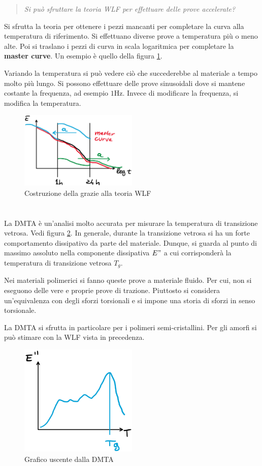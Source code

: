 \begin{quote}
\emph{Si può sfruttare la teoria \ac{WLF} per effettuare delle prove accelerate?}
\end{quote}
Si sfrutta la teoria per ottenere i pezzi mancanti per completare la curva alla temperatura di riferimento.
Si effettuano diverse prove a temperatura più o meno alte. Poi si traslano i pezzi di curva in scala logaritmica per completare la \textbf{master curve}.
Un esempio è quello della figura \ref{fig:WLF}.

Variando la temperatura si può vedere ciò che succederebbe al materiale a tempo molto più lungo.
Si possono effettuare delle prove sinusoidali dove si mantene costante la frequenza, ad esempio $1\unit{\hertz}$.
Invece di modificare la frequenza, si modifica la temperatura.

\begin{figure}
\centering
\includegraphics[width = 0.5\textwidth]{gfx/WLF}
\caption{Costruzione della  grazie alla teoria \ac{WLF}}
\label{fig:WLF}
\end{figure}

\section{}
La \ac{DMTA} è un'analisi molto accurata per misurare la temperatura di transizione vetrosa. Vedi figura \ref{fig:DMTA}.
In generale, durante la transizione vetrosa si ha un forte comportamento dissipativo da parte del materiale.
Dunque, si guarda al punto di massimo assoluto nella componente dissipativa $E"$ a cui corrisponderà la temperatura di transizione vetrosa $T_g$.

Nei materiali polimerici si fanno queste prove a materiale fluido.
Per cui, non si eseguono delle vere e proprie prove di trazione.
Piuttosto si considera un'equivalenza con degli sforzi torsionali e si impone una storia di sforzi in senso torsionale.

La \ac{DMTA} si sfrutta in particolare per i polimeri semi-cristallini.
Per gli amorfi si può stimare con la \ac{WLF} vista in precedenza.

\begin{figure}
\centering
\includegraphics[width = 0.5\textwidth]{gfx/DMTA}
\caption{Grafico uscente dalla \ac{DMTA}}
\label{fig:DMTA}
\end{figure}